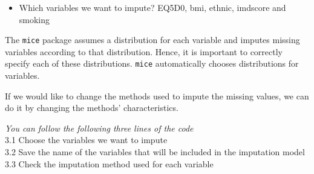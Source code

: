 \documentclass[
]{article}
\providecommand{\tightlist}{%
  \setlength{\itemsep}{0pt}\setlength{\parskip}{0pt}}
\begin{document}
\begin{itemize}
\tightlist
\item
  Which variables we want to impute? EQ5D0, bmi, ethnic, imdscore and
  smoking
\end{itemize}

The \texttt{mice} package assumes a distribution for each variable and
imputes missing variables according to that distribution. Hence, it is
important to correctly specify each of these distributions.
\texttt{mice} automatically chooses distributions for variables.

If we would like to change the methods used to impute the missing
values, we can do it by changing the methods' characteristics.

\emph{You can follow the following three lines of the code}\\
3.1 Choose the variables we want to impute\\
3.2 Save the name of the variables that will be included in the
imputation model\\
3.3 Check the imputation method used for each variable
\end{document}
